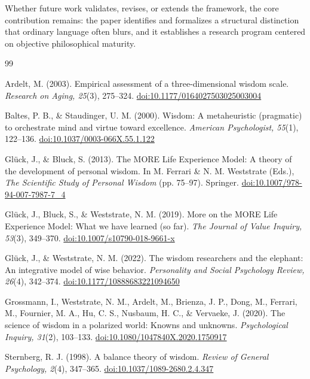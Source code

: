 \documentclass[11pt]{article}
\begin{document}
Whether future work validates, revises, or extends the framework, the core contribution remains: the paper identifies and formalizes a structural distinction that ordinary language often blurs, and it establishes a research program centered on objective philosophical maturity.


\clearpage
\begin{thebibliography}{99}

Ardelt, M. (2003).
Empirical assessment of a three-dimensional wisdom scale.
\emph{Research on Aging, 25}(3), 275--324.
\href{https://doi.org/10.1177/0164027503025003004}{doi:10.1177/0164027503025003004}

Baltes, P. B., \& Staudinger, U. M. (2000).
Wisdom: A metaheuristic (pragmatic) to orchestrate mind and virtue toward excellence.
\emph{American Psychologist, 55}(1), 122--136.
\href{https://doi.org/10.1037/0003-066X.55.1.122}{doi:10.1037/0003-066X.55.1.122}

Gl\"uck, J., \& Bluck, S. (2013).
The MORE Life Experience Model: A theory of the development of personal wisdom.
In M. Ferrari \& N. M. Weststrate (Eds.), \emph{The Scientific Study of Personal Wisdom} (pp. 75--97).
Springer.
\href{https://doi.org/10.1007/978-94-007-7987-7_4}{doi:10.1007/978-94-007-7987-7\_4}

Gl\"uck, J., Bluck, S., \& Weststrate, N. M. (2019).
More on the MORE Life Experience Model: What we have learned (so far).
\emph{The Journal of Value Inquiry, 53}(3), 349--370.
\href{https://doi.org/10.1007/s10790-018-9661-x}{doi:10.1007/s10790-018-9661-x}

Gl\"uck, J., \& Weststrate, N. M. (2022).
The wisdom researchers and the elephant: An integrative model of wise behavior.
\emph{Personality and Social Psychology Review, 26}(4), 342--374.
\href{https://doi.org/10.1177/10888683221094650}{doi:10.1177/10888683221094650}

Grossmann, I., Weststrate, N. M., Ardelt, M., Brienza, J. P., Dong, M., Ferrari, M., Fournier, M. A., Hu, C. S., Nusbaum, H. C., \& Vervaeke, J. (2020).
The science of wisdom in a polarized world: Knowns and unknowns.
\emph{Psychological Inquiry, 31}(2), 103--133.
\href{https://doi.org/10.1080/1047840X.2020.1750917}{doi:10.1080/1047840X.2020.1750917}

Sternberg, R. J. (1998).
A balance theory of wisdom.
\emph{Review of General Psychology, 2}(4), 347--365.
\href{https://doi.org/10.1037/1089-2680.2.4.347}{doi:10.1037/1089-2680.2.4.347}

\end{thebibliography}
\end{document}

